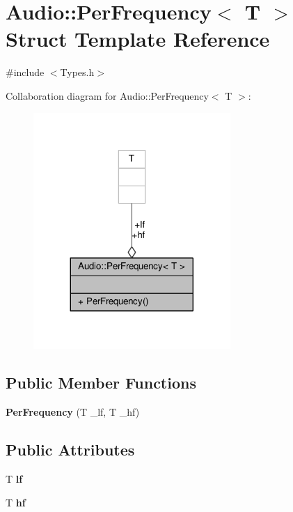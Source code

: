 \hypertarget{structAudio_1_1PerFrequency}{}\section{Audio\+:\+:Per\+Frequency$<$ T $>$ Struct Template Reference}
\label{structAudio_1_1PerFrequency}


{\ttfamily \#include $<$Types.\+h$>$}



Collaboration diagram for Audio\+:\+:Per\+Frequency$<$ T $>$\+:
\nopagebreak
\begin{figure}[H]
\begin{center}
\leavevmode
\includegraphics[width=212pt]{dd/d0c/structAudio_1_1PerFrequency__coll__graph}
\end{center}
\end{figure}
\subsection*{Public Member Functions}
\begin{DoxyCompactItemize}
\item 
{\bfseries Per\+Frequency} (T \+\_\+lf, T \+\_\+hf)\hypertarget{structAudio_1_1PerFrequency_aed25a63774e0a95e3b9d659e91347bfe}{}\label{structAudio_1_1PerFrequency_aed25a63774e0a95e3b9d659e91347bfe}

\end{DoxyCompactItemize}
\subsection*{Public Attributes}
\begin{DoxyCompactItemize}
\item 
T {\bfseries lf}\hypertarget{structAudio_1_1PerFrequency_afc7d41d3f6f5b3065318487456877cd7}{}\label{structAudio_1_1PerFrequency_afc7d41d3f6f5b3065318487456877cd7}

\item 
T {\bfseries hf}\hypertarget{structAudio_1_1PerFrequency_ae0b5a97910f858c2998ca2eb07a0f60c}{}\label{structAudio_1_1PerFrequency_ae0b5a97910f858c2998ca2eb07a0f60c}

\end{DoxyCompactItemize}


